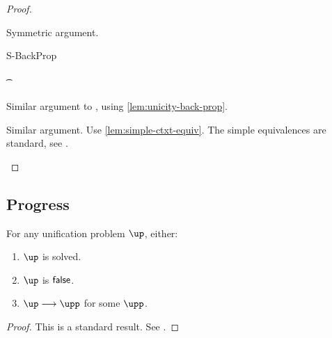 \documentclass[acmsmall,screen,nonacm,review]{acmart}
\begin{document}
\begin{proof}
\begin{proofcases}
\begin{proofcases}
      \begin{llproof}
	Symmetric argument.
      \end{llproof}

    \end{proofcases}


  \proofcaserewrite
    {S-BackProp}
    {\C\where
       {\cletr \x \tv {\tvs} {\Ca\where{\cmatch \tvp \cbrs}}
                           {\Cb\where{\cpapp \x \tvp \tvc \inst}}} \\
    \tvp \in \reg \tv \tvs \\
     \cunif {\tvc} {\cunif \t \ueq} \in \C\where\Cb \\
     \x \disjoint \bvs \Cb}
    {\C\where{\cletr \x \tv {\tvs} {\Ca\where{\cmatched \tvp {\shape \t} \cbrs}}
		      {\Cb\where{\cpapp \x \tvp \tvc \inst}}}}


    \begin{llproof}
      Similar argument to , using \cref{lem:unicity-back-prop}.
    \end{llproof}


  \begin{llproof}
    Similar argument. Use \cref{lem:simple-ctxt-equiv}.
    The simple equivalences are standard, see \citet*{Pottier-Remy/emlti}.
  \end{llproof}
  \end{proofcases}
\end{proof}

\subsection{Progress}

\begin{lemma}
  For any unification problem $\up$, either:
  \begin{enumerate}[(\roman*)]
    \item $\up$ is solved.
    \item $\up$ is $\mathsf{false}$.
    \item $\up \unif \upp$ for some $\upp$.
    \end{enumerate}
  \begin{proof}
    This is a standard result. See \citet*{Pottier-Remy/emlti}.
  \end{proof}
\end{lemma}
\end{document}
